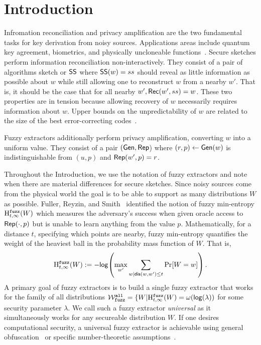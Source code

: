 
\section{Introduction}
Infromation reconciliation and privacy amplification are the two fundamental tasks for key derivation from noisy sources.  Applications areas include quantum key agreement, biometrics, and physically uncloneable functions~\cite{bennett1988privacy,dodis2008fuzzy}. Secure sketches perform information reconciliation non-interactively.  They consist of a pair of algorithms sketch or ${\mathsf{SS}}$ where ${\mathsf{SS}}(w) = ss$ should reveal as little information as possible about $w$ while still allowing one to reconstruct $w$ from a nearby $w'$. That is, it should be the case that for all nearby $w', {\mathsf{Rec}}(w', ss) = w$.  These two properties are in tension because allowing recovery of $w$ necessarily requires information about $w$.  Upper bounds on the unpredictability of $w$ are related to the size of the best error-correcting codes~\cite{dodis2008fuzzy,fuller2020computational}. 

  Fuzzy extractors additionally perform privacy amplification, converting $w$ into a uniform value.  They consist of a pair $({\mathsf{Gen}}, {\mathsf{Rep}}$) where $(r, p)\leftarrow {\ensuremath{\mathsf{Gen}}}(w)$ is indistinguishable from $(u, p)$ and ${\mathsf{Rep}}(w', p) =r$.

Throughout the Introduction, we use the notation of fuzzy extractors and note when there are material differences for secure sketches.
Since noisy sources come from the physical world the goal is to be able to support as many distributions $W$ as possible.  Fuller, Reyzin, and Smith~\cite{fuller2016fuzzy,fuller2020fuzzy} identified the notion of fuzzy min-entropy $\mathrm{H}^{\mathtt{fuzz}}_{t,\infty}(W)$ which measures the adversary's success when given oracle access to ${\mathsf{Rep}}(\cdot, p)$ but is unable to learn anything from the value  $p$.  Mathematically, for a distance $t$, specifying which points are nearby, fuzzy min-entropy quantifies the weight of the heaviest ball in the probability mass function of $W$.  That is, 
\[
\mathrm{H}^{\mathtt{fuzz}}_{t,\infty}(W):= -\mathsf{log}\!\left(\max_{w'} \sum_{w | \mathsf{dis}(w, w')\le t} \Pr[W=w]\right).
\]A primary goal of fuzzy extractors is to build a single fuzzy extractor that works for the family of all distributions $\mathcal{W}_{\mathtt{fuzz}}^{\mathtt{all}} = \{ W | \mathrm{H}^{\mathtt{fuzz}}_{t,\infty}(W) = \omega(\mathsf{log}\!\left(\lambda\right))$ for some security parameter $\lambda$.  We call such a fuzzy extractor \emph{universal} as it simultaneously works for any secureable distribution $W$. 
If one desires computational security, a universal fuzzy extractor is achievable using general obfuscation~\cite{BarakBCKPS13,BitanskyCKP14,bitansky2017virtual} or specific number-theoretic assumptions~\cite{galbraith2019obfuscated}. 

